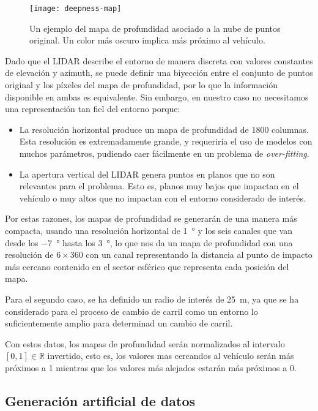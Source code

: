 \begin{figure}
	\centering
	\texttt{[image: deepness-map]}
	\caption[Ejemplo de un mapa de profundidad]{Un ejemplo del mapa de profundidad asociado a la nube de puntos original. Un color más oscuro implica más próximo al vehículo.}
	\label{fig:deepmap-example}
\end{figure}

Dado que el LIDAR describe el entorno de manera discreta con valores constantes de elevación y azimuth, se puede definir una biyección entre el conjunto de puntos original y los píxeles del mapa de profundidad, por lo que la información disponible en ambas es equivalente. Sin embargo, en nuestro caso no necesitamos una representación tan fiel del entorno porque:

\begin{itemize}
	\item La resolución horizontal produce un mapa de profundidad de $1800$ columnas. Esta resolución es extremadamente grande, y requeriría el uso de modelos con muchos parámetros, pudiendo caer fácilmente en un problema de \textit{over-fitting}.
	\item La apertura vertical del LIDAR genera puntos en planos que no son relevantes para el problema. Esto es, planos muy bajos que impactan en el vehículo o muy altos que no impactan con el entorno considerado de interés.
\end{itemize}

Por estas razones, los mapas de profundidad se generarán de una manera más compacta, usando una resolución horizontal de \SI{1}{\degree} y los seis canales que van desde los \SI{-7}{\degree} hasta los \SI{3}{\degree}, lo que nos da un mapa de profundidad con una resolución de $6 \times 360$ con un canal representando la distancia al punto de impacto más cercano contenido en el sector esférico que representa cada posición del mapa.

Para el segundo caso, se ha definido un radio de interés de \SI{25}{\meter}, ya que se ha considerado para el proceso de cambio de carril como un entorno lo suficientemente amplio para determinad un cambio de carril.

Con estos datos, los mapas de profundidad serán normalizados al intervalo $[0, 1] \in \mathbb{R}$ invertido, esto es, los valores mas cercandos al vehículo serán más próximos a 1 mientras que los valores más alejados estarán más próximos a 0.

\subsection{Generación artificial de datos}


